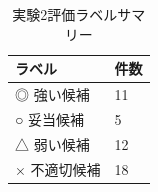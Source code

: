 \begin{table}[tbp]
\centering
\small
\caption{実験2評価ラベルサマリー}
\label{tab:experiment2\_label\_summary}
\begin{tabular}{ll}
\toprule
ラベル & 件数 \\
\midrule
◎ 強い候補 & 11 \\
○ 妥当候補 & 5 \\
△ 弱い候補 & 12 \\
× 不適切候補 & 18 \\
\bottomrule
\end{tabular}
\end{table}
